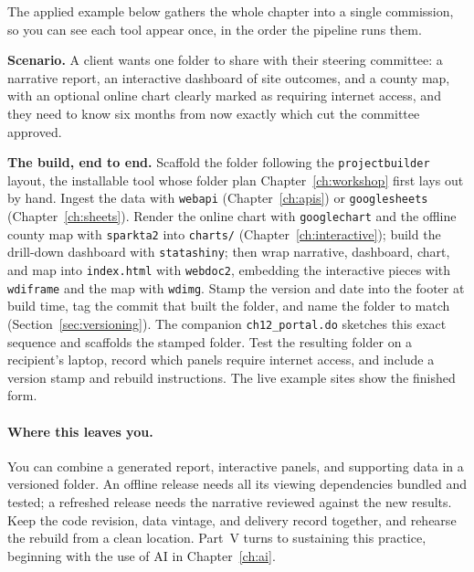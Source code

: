 \documentclass[
    a4paper,
    fontsize=10pt,
    twoside=true,
    numbers=noenddot,
]{kaobook}
\newcounter{appliedexample}
\newenvironment{appliedexample}[1][]{%
    \refstepcounter{appliedexample}%
    \begin{appliedexamplebox}[frametitle={Applied Example~\theappliedexample.~~#1}]%
}{%
    \end{appliedexamplebox}%
}
\begin{document}
The applied example below gathers the whole chapter into a single commission, so you can see each tool appear once, in the order the pipeline runs them.

\begin{appliedexample}[One evaluation, one folder]\label{ae:ch12-onefolder}
\textbf{Scenario.} A client wants one folder to share with their steering committee: a narrative report, an interactive dashboard of site outcomes, and a county map, with an optional online chart clearly marked as requiring internet access, and they need to know six months from now exactly which cut the committee approved.

\medskip
\textbf{The build, end to end.} Scaffold the folder following the \texttt{projectbuilder} layout, the installable tool whose folder plan Chapter~\ref{ch:workshop} first lays out by hand. Ingest the data with \texttt{webapi} (Chapter~\ref{ch:apis}) or \texttt{googlesheets} (Chapter~\ref{ch:sheets}). Render the online chart with \texttt{googlechart} and the offline county map with \texttt{sparkta2} into \texttt{charts/} (Chapter~\ref{ch:interactive}); build the drill-down dashboard with \texttt{statashiny}; then wrap narrative, dashboard, chart, and map into \texttt{index.html} with \texttt{webdoc2}, embedding the interactive pieces with \texttt{wdiframe} and the map with \texttt{wdimg}. Stamp the version and date into the footer at build time, tag the commit that built the folder, and name the folder to match (Section~\ref{sec:versioning}). The companion \texttt{ch12\_portal.do} sketches this exact sequence and scaffolds the stamped folder. Test the resulting folder on a recipient's laptop, record which panels require internet access, and include a version stamp and rebuild instructions. The live example sites show the finished form.
\end{appliedexample}

\paragraph{Where this leaves you.} You can combine a generated report, interactive panels, and supporting data in a versioned folder. An offline release needs all its viewing dependencies bundled and tested; a refreshed release needs the narrative reviewed against the new results. Keep the code revision, data vintage, and delivery record together, and rehearse the rebuild from a clean location. Part~V turns to sustaining this practice, beginning with the use of AI in Chapter~\ref{ch:ai}.
\end{document}

